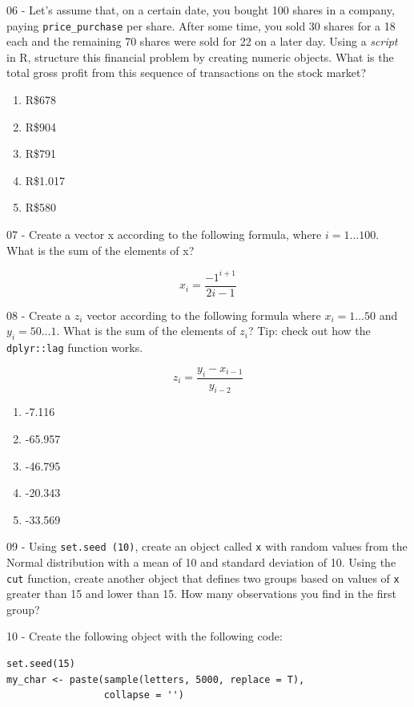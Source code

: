 \documentclass[
  12pt,
]{book}
\providecommand{\tightlist}{%
  \setlength{\itemsep}{0pt}\setlength{\parskip}{0pt}}
\begin{document}
06 -
Let's assume that, on a certain date, you bought 100 shares in a company, paying \texttt{price\_purchase} per share. After some time, you sold 30 shares for a 18 each and the remaining 70 shares were sold for 22 on a later day. Using a \emph{script} in R, structure this financial problem by creating numeric objects. What is the total gross profit from this sequence of transactions on the stock market?

\begin{enumerate}
\def\labelenumi{\alph{enumi})}
\tightlist
\item
  R\$678
\item
  R\$904
\item
  R\$791
\item
  R\$1.017
\item
  R\$580
\end{enumerate}

07 -
Create a vector x according to the following formula, where \(i = 1 ... 100\). What is the sum of the elements of x?

\[
x_i=\frac{-1^{i+1}}{2i-1}
\]

08 -
Create a \(z_i\) vector according to the following formula where \(x_i = 1 ... 50\) and \(y_i = 50 ... 1\). What is the sum of the elements of \(z_i\)? Tip: check out how the \texttt{dplyr::lag} function works.

\[
z_i=\frac{y_i - x_{i-1}}{y_{i-2}}
\]

\begin{enumerate}
\def\labelenumi{\alph{enumi})}
\tightlist
\item
  -7.116
\item
  -65.957
\item
  -46.795
\item
  -20.343
\item
  -33.569
\end{enumerate}

09 -
Using \texttt{set.seed\ (10)}, create an object called \texttt{x} with random values from the Normal distribution with a mean of 10 and standard deviation of 10. Using the \texttt{cut} function, create another object that defines two groups based on values of \texttt{x} greater than 15 and lower than 15. How many observations you find in the first group?

10 -
Create the following object with the following code:

\begin{verbatim}
set.seed(15)
my_char <- paste(sample(letters, 5000, replace = T), 
                 collapse = '')
\end{verbatim}
\end{document}
